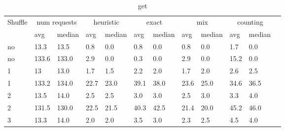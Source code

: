 \documentclass[a4paper]{report}
\begin{document}
\begin{table}[h]
	\centering
	\caption{get}
	\label{tab:get}
	\begin{tabular}{|l|l|l|l|l|l|l|l|l|l|l|l|}
		\hline
		\multirow{2}{*}{Shuffle} & \multicolumn{2}{|c|}{num requests} & \multicolumn{2}{|c|}{heuristic} & \multicolumn{2}{|c|}{exact} & \multicolumn{2}{|c|}{mix} & \multicolumn{2}{|c|}{counting}                                          \\ \cline{2-11}
		                         & avg                                & median                          & avg                         & median                    & avg                            & median & avg  & median & avg  & median \\ \hline
		no                       & 13.3                               & 13.5                            & 0.8                         & 0.0                       & 0.8                            & 0.0    & 0.8  & 0.0    & 1.7  & 0.0    \\ \hline
		no                       & 133.6                              & 133.0                           & 2.9                         & 0.0                       & 0.3                            & 0.0    & 2.9  & 0.0    & 15.2 & 0.0    \\ \hline
		1                        & 13                                 & 13.0                            & 1.7                         & 1.5                       & 2.2                            & 2.0    & 1.7  & 2.0    & 2.6  & 2.5    \\ \hline
		1                        & 133.2                              & 134.0                           & 22.7                        & 23.0                      & 39.1                           & 38.0   & 23.6 & 25.0   & 34.6 & 36.5   \\ \hline
		2                        & 13.5                               & 14.0                            & 2.5                         & 2.5                       & 3.0                            & 3.0    & 2.5  & 3.0    & 3.3  & 4.0    \\ \hline
		2                        & 131.5                              & 130.0                           & 22.5                        & 21.5                      & 40.3                           & 42.5   & 21.4 & 20.0   & 45.2 & 46.0   \\ \hline
		3                        & 13.3                               & 14.0                            & 2.0                         & 2.0                       & 3.5                            & 3.0    & 2.3  & 2.5    & 4.5  & 4.0    \\ \hline

\end{tabular}
\end{table}
\end{document}
